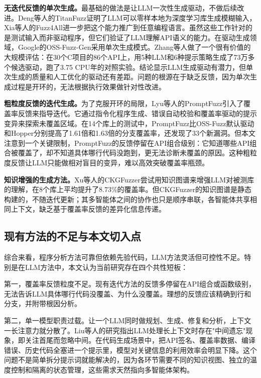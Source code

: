 \textbf{无迭代反馈的单次生成。}最基础的做法是让LLM一次性生成驱动，不做后续改进。Deng等人的TitanFuzz\cite{deng2023b}证明了LLM可以零样本地为深度学习库生成模糊输入，Xia等人的Fuzz4All\cite{xia2024}进一步把这个能力推广到任意编程语言。虽然这些工作针对的是测试输入而非驱动程序，但它们验证了LLM理解API语义的能力。在驱动生成领域，Google的OSS-Fuzz-Gen\cite{liu2023}采用单次生成模式。Zhang等人\cite{zhang2024}做了一个很有价值的大规模评估：在30个C项目的86个API上，用5种LLM和6种提示策略生成了73万多个候选驱动，跑了3.75 CPU年的对照实验。结论显示LLM生成驱动有潜力，但单次生成的质量和人工优化的驱动还有差距。问题的根源在于缺乏反馈，因为单次生成过程是开环的，无法根据执行效果做针对性改进。

\textbf{粗粒度反馈的迭代生成。}为了克服开环的局限，Lyu等人的PromptFuzz\cite{lyu2024}引入了覆盖率反馈来指导迭代。它通过指令化程序生成、错误自动校验和覆盖率驱动的提示变异来探索未覆盖区域。在14个库上的测试中，PromptFuzz比OSS-Fuzz默认驱动和Hopper分别提高了1.61倍和1.63倍的分支覆盖率，还发现了33个新漏洞。但本文注意到一个关键限制，PromptFuzz的反馈停留在API组合级别：它知道哪些API组合被覆盖了，却不知道具体哪行代码没跑到，更无法诊断未覆盖的原因。这种粗粒度反馈让LLM只能做相对盲目的变异，难以高效突破覆盖率瓶颈。

\textbf{知识增强的生成方法。}Xu等人的CKGFuzzer\cite{xu2024}尝试用知识图谱来增强LLM对被测库的理解，在8个库上平均提升了8.73\%的覆盖率。但CKGFuzzer的知识图谱是静态构建的，不随迭代更新；其多智能体之间的协作也只是顺序串联，各智能体共享相同上下文，缺乏基于覆盖率反馈的差异化信息传递。

\subsection{现有方法的不足与本文切入点}

综合来看，程序分析方法可靠但依赖先验代码，LLM方法灵活但可控性不足。特别是在LLM方法中，本文认为当前研究存在四个共性短板：

第一，覆盖率反馈粒度不足。现有迭代方法的反馈多停留在API组合或函数级别，无法告诉LLM具体哪行代码没覆盖、为什么没覆盖。理想的反馈应该精确到行和分支，并附带根因分析。

第二，单一模型职责过载。让一个LLM同时做规划、生成、修复和分析，上下文一长注意力就分散了。Liu等人\cite{liu2024lost}的研究指出LLM处理长上下文时存在"中间遗忘"现象，即关注首尾而忽略中间。在代码生成场景中，把API签名、覆盖率数据、编译错误、历史代码全塞进一个提示里，模型对关键信息的利用效率会明显下降。这个问题不是简单拆分提示词就能解决的，因为各环节需要不同的知识视图、独立的温度控制和隔离的状态管理，这些需求天然指向多智能体架构。

